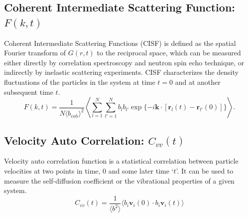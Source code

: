 \documentclass{article}
\begin{document}
\subsection{Coherent Intermediate Scattering Function: $F(k,t)$} \label{sec::Fqt}
Coherent Intermediate Scattering Functions (CISF) is defined as the spatial Fourier transform of $G(r,t)$ to the reciprocal space, which can be measured either directly by correlation spectroscopy and neutron spin echo technique, or indirectly by inelastic scattering experiments. CISF characterizes the density fluctuations of the particles in the system at time $t = 0$ and at another subsequent time $t$.
\begin{equation}
\label{eq:fqt}
F(k,t) = \frac{1}{N\langle b_{coh}\rangle^2} \left\langle \sum_{l=1}^{N}\sum_{l'=1}^{N} b_lb_{l'}\exp{\{-i\mathbf{k}\cdot[\mathbf{r}_l(t) - \mathbf{r}_{l'}(0)]}\}\right\rangle.
\end{equation}  

\subsection{Velocity Auto Correlation: $C_{vv}(t)$} \label{sec::VACF}
Velocity auto correlation function is a statistical correlation between particle velocities at two points in time, 0 and some later time `$t$'. It can be used to measure the self-diffusion coefficient or the vibrational properties of a given system.
\begin{equation}
\label{eq:vacf}
 C_{vv}(t) = \frac{1}{\langle b^2\rangle}\langle b_i\textbf{v}_i(0)\cdot b_i\textbf{v}_i(t)\rangle
\end{equation} 
\end{document}
